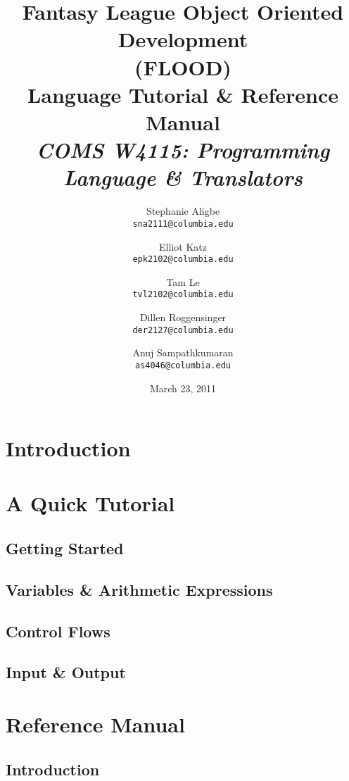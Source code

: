 \documentclass[12pt]{report}
\begin{document}
\title{
\textbf{Fantasy League Object Oriented Development}\\
\textbf{(FLOOD)}\\
\LARGE{Language Tutorial \& Reference Manual}\\
{\normalsize \textit{COMS W4115: Programming Language \& Translators}}\\
}
\author{
  Stephanie Aligbe\\
  \texttt{\small{sna2111@columbia.edu}}
  \and
  Elliot Katz\\
  \texttt{\small{epk2102@columbia.edu}}
  \and
  Tam Le\\
  \texttt{\small{tvl2102@columbia.edu}}
  \and
  Dillen Roggensinger\\
  \texttt{\small{der2127@columbia.edu}}
  \and
  Anuj Sampathkumaran\\
  \texttt{\small{as4046@columbia.edu}}
}
\date{March 23, 2011}

\maketitle
\tableofcontents

\chapter{Introduction}

\chapter{A Quick Tutorial}
\section{Getting Started}
\section{Variables \& Arithmetic Expressions}
\section{Control Flows}
\section{Input \& Output}

\chapter{Reference Manual}
\section{Introduction}
\end{document}

